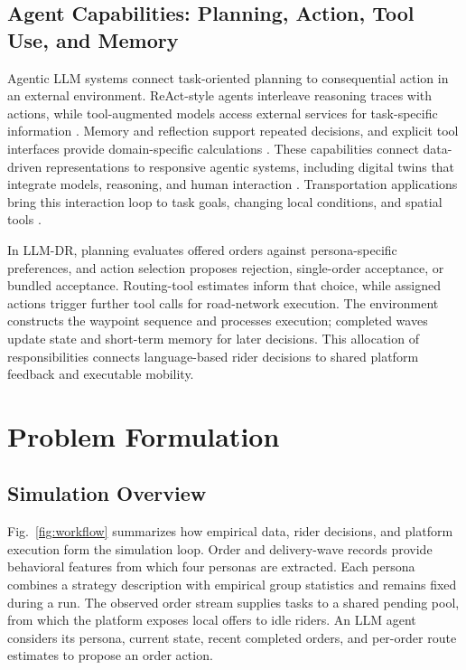 \documentclass[letterpaper,journal]{IEEEtran}
\begin{document}
\subsection{Agent Capabilities: Planning, Action, Tool Use, and \mbox{Memory}}
Agentic LLM systems connect task-oriented planning to consequential action in an external environment. ReAct-style agents interleave reasoning traces with actions, while tool-augmented models access external services for task-specific information \cite{yaoReActSynergizingReasoning2023,schickToolformerLanguageModels2023,qinToolLLMFacilitating2024}. Memory and reflection support repeated decisions, and explicit tool interfaces provide domain-specific calculations \cite{shinnReflexionLanguageAgents2023,zhangSurveyMemoryMechanism2025,goodellLargeLanguageModelAgents2025}. These capabilities connect data-driven representations to responsive agentic systems, including digital twins that integrate models, reasoning, and human interaction \cite{sanEvolutionDigitalTwins2026}. Transportation applications bring this interaction loop to task goals, changing local conditions, and spatial tools \cite{yuPreparingAgenticEra2025,yuAgenticVehicles2026}.

In LLM-DR, planning evaluates offered orders against persona-specific preferences, and action selection proposes rejection, single-order acceptance, or bundled acceptance. Routing-tool estimates inform that choice, while assigned actions trigger further tool calls for road-network execution. The environment constructs the waypoint sequence and processes execution; completed waves update state and short-term memory for later decisions. This allocation of responsibilities connects language-based rider decisions to shared platform feedback and executable mobility.

\section{Problem Formulation}
\subsection{Simulation Overview}
Fig.~\ref{fig:workflow} summarizes how empirical data, rider decisions, and platform execution form the simulation loop. Order and delivery-wave records provide behavioral features from which four personas are extracted. Each persona combines a strategy description with empirical group statistics and remains fixed during a run. The observed order stream supplies tasks to a shared pending pool, from which the platform exposes local offers to idle riders. An LLM agent considers its persona, current state, recent completed orders, and per-order route estimates to propose an order action.
\end{document}
